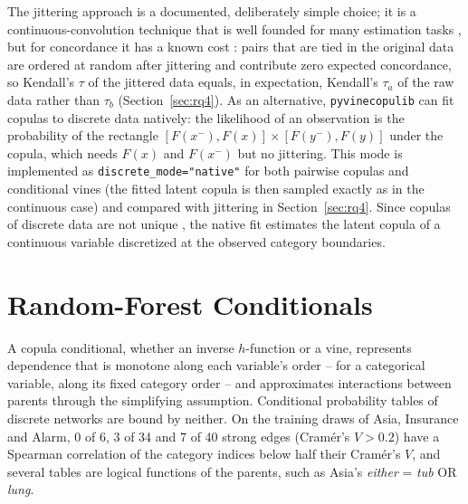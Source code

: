 \documentclass[
  english,
  class=report,
  accentcolor=2c,
  marginpar=false,
  parskip=half-,
  fontsize=11pt,
  ruledheaders=false,
  pdfa=false,
  IMRAD=false,
  thesis={type=master}
]{tudapub}
\begin{document}
The jittering approach is a documented, deliberately simple choice; it is
a continuous-convolution technique that is well founded for many estimation
tasks \parencite{nagler2018}, but for concordance it has a known cost
\parencite{denuit2005,genest2007}: pairs that are tied in the original
data are ordered at random after jittering and contribute zero expected
concordance, so Kendall's $\tau$ of the jittered data equals, in
expectation, Kendall's $\tau_a$ of the raw data rather than $\tau_b$
(Section~\ref{sec:rq4}). As an alternative, \texttt{pyvinecopulib} can fit
copulas to discrete data natively: the likelihood of an observation is the
probability of the rectangle $[F(x^-), F(x)] \times [F(y^-), F(y)]$ under
the copula, which needs $F(x)$ and $F(x^-)$ but no jittering. This mode is
implemented as \texttt{discrete\_mode="native"} for both pairwise copulas
and conditional vines (the fitted latent copula is then sampled exactly as
in the continuous case) and compared with jittering in
Section~\ref{sec:rq4}. Since copulas of discrete data are not unique
\parencite{genest2007}, the native fit estimates the latent copula of a
continuous variable discretized at the observed category boundaries.

\section{Random-Forest Conditionals}
\label{sec:forest-method}
A copula conditional, whether an inverse $h$-function or a vine, represents
dependence that is monotone along each variable's order -- for a
categorical variable, along its fixed category order -- and approximates
interactions between parents through the simplifying assumption.
Conditional probability tables of discrete networks are bound by neither.
On the training draws of Asia, Insurance and Alarm, 0 of 6,
3 of 34 and 7 of 40 strong edges (Cram\'er's $V > 0.2$) have a
Spearman correlation of the category indices below half their Cram\'er's
$V$, and several tables are logical functions of the parents, such as Asia's
\emph{either} = \emph{tub} OR \emph{lung}.
\end{document}
